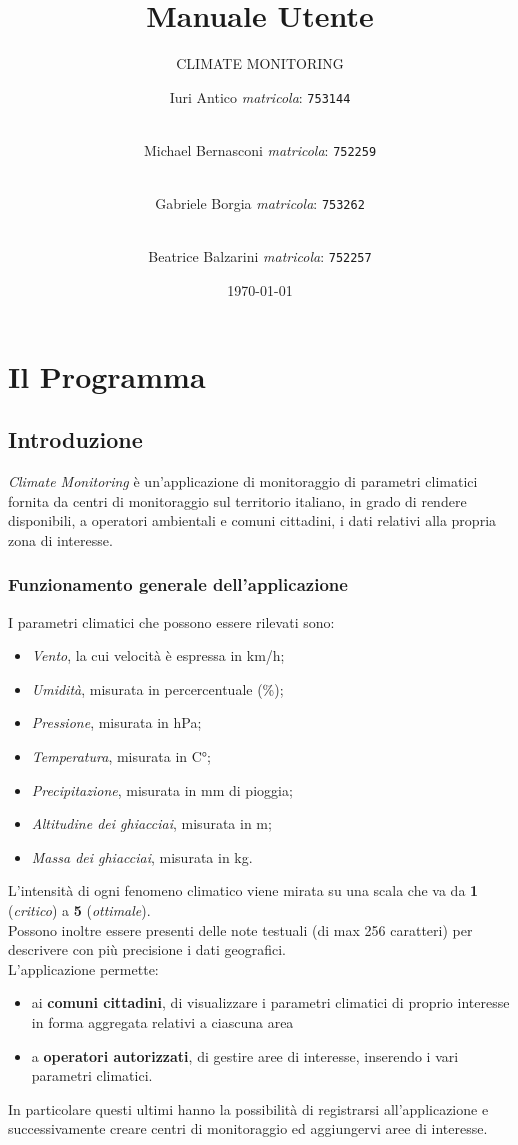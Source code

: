 \documentclass[12pt]{scrreprt}
\title{Manuale Utente}
\subtitle{CLIMATE MONITORING}
\author{
	Iuri Antico \textit{matricola}:
	\texttt{753144}
	\and \\
	Michael Bernasconi \textit{matricola}:
	\texttt{752259}
	\and \\
	Gabriele Borgia \textit{matricola}:
	\texttt{753262}
	\and \\
	Beatrice Balzarini \textit{matricola}:
	\texttt{752257}
}
\date{\today}
\begin{document}
	\maketitle

	\tableofcontents
	\listoffigures
	\listoftables

	\chapter{Il Programma}
	\section{Introduzione}
		\textit{Climate Monitoring} è un'applicazione di monitoraggio di parametri climatici fornita da centri di monitoraggio sul territorio italiano, in grado di rendere disponibili, a operatori ambientali e comuni cittadini, i dati relativi alla propria zona di interesse.

		\subsection{Funzionamento generale dell'applicazione}
		I parametri climatici che possono essere rilevati sono:
		\begin{itemize}
		\item \textit{Vento}, la cui velocità è espressa in km/h;
		\item \textit{Umidità}, misurata in percercentuale (\%);
		\item \textit{Pressione}, misurata in hPa;
		\item \textit{Temperatura}, misurata in C°;
		\item \textit{Precipitazione}, misurata in mm di pioggia;
		\item \textit{Altitudine dei ghiacciai}, misurata in m;
		\item \textit{Massa dei ghiacciai}, misurata in kg.
		\end{itemize}
		L'intensità di ogni fenomeno climatico viene mirata su una scala che va da \textbf{1} (\textit{critico}) a \textbf{5} (\textit{ottimale}).
		\\
		Possono inoltre essere presenti delle note testuali (di max 256 caratteri) per descrivere con più precisione i dati geografici.
		\\
		L'applicazione permette:
		\begin{itemize}
		\item ai \textbf{comuni cittadini}, di visualizzare i parametri climatici di proprio interesse in forma aggregata relativi a ciascuna area
		\item a \textbf{operatori autorizzati}, di gestire aree di interesse, inserendo i vari parametri climatici.
		\end{itemize}
		In particolare questi ultimi hanno la possibilità di registrarsi all'applicazione e successivamente creare centri di monitoraggio ed aggiungervi aree di interesse.
\end{document}
